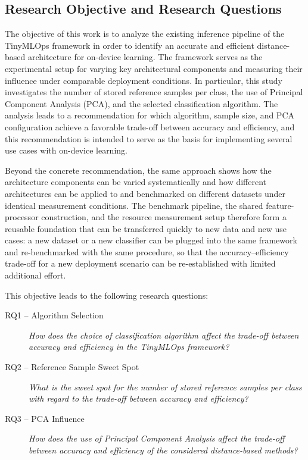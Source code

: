 \documentclass[sigconf,review]{acmart}
\begin{document}
\subsection{Research Objective and Research Questions}
The objective of this work is to analyze the existing inference pipeline of the TinyMLOps framework in order to identify an accurate and efficient distance-based architecture for on-device learning.
The framework serves as the experimental setup for varying key architectural components and measuring their influence under comparable deployment conditions.
In particular, this study investigates the number of stored reference samples per class, the use of Principal Component Analysis (PCA), and the selected classification algorithm.
The analysis leads to a recommendation for which algorithm, sample size, and PCA configuration achieve a favorable trade-off between accuracy and efficiency, and this recommendation is intended to serve as the basis for implementing several use cases with on-device learning.

Beyond the concrete recommendation, the same approach shows how the architecture components can be varied systematically and how different architectures can be applied to and benchmarked on different datasets under identical measurement conditions.
The benchmark pipeline, the shared feature-processor construction, and the resource measurement setup therefore form a reusable foundation that can be transferred quickly to new data and new use cases: a new dataset or a new classifier can be plugged into the same framework and re-benchmarked with the same procedure, so that the accuracy--efficiency trade-off for a new deployment scenario can be re-established with limited additional effort.

This objective leads to the following research questions:

\begin{description}
  \item[RQ1 -- Algorithm Selection] \emph{How does the choice of classification algorithm affect the trade-off between accuracy and efficiency in the TinyMLOps framework?}
  \item[RQ2 -- Reference Sample Sweet Spot] \emph{What is the sweet spot for the number of stored reference samples per class with regard to the trade-off between accuracy and efficiency?}
  \item[RQ3 -- PCA Influence] \emph{How does the use of Principal Component Analysis affect the trade-off between accuracy and efficiency of the considered distance-based methods?}
\end{description}
\end{document}
